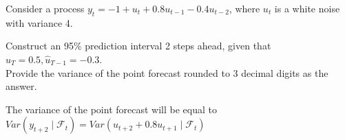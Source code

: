 
\begin{question}
Consider a process \(y_t = -1 + u_t + 0.8 u_{t-1} - 0.4 u_{t-2}\), where \(u_t\) is a white noise with variance 4.

Construct an 95\% prediction interval 2 steps ahead, given that \(\hat{u}_T=0.5, \hat{u}_{T-1}=-0.3\).\\
Provide the variance of the point forecast rounded to 3 decimal digits as the answer.
\end{question}

\begin{solution}
The variance of the point forecast will be equal to \(Var(y_{t+2}\mid \mathcal{F}_t) = Var(u_{t+2} + 0.8 u_{t+1} \mid \mathcal{F}_t)\)
\end{solution}

